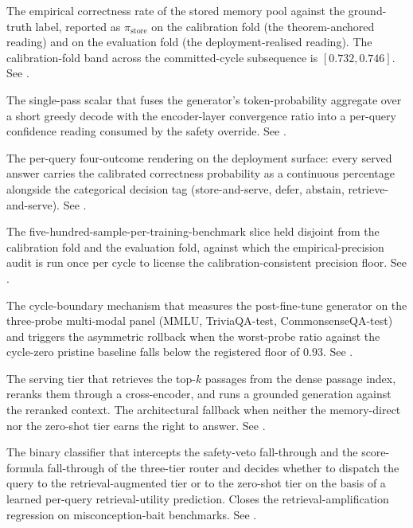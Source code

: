 \begin{description}[style=nextline, leftmargin=0pt, labelindent=0pt, itemsep=6pt, parsep=0pt, font=\bfseries, beginpenalty=10000]
\item[Pool purity.] The empirical correctness rate of the stored memory pool against the ground-truth label, reported as $\pi_{\text{store}}$ on the calibration fold (the theorem-anchored reading) and on the evaluation fold (the deployment-realised reading). The calibration-fold band across the committed-cycle subsequence is $[0.732, 0.746]$. See .

\item[Pre-routing confidence (\boldmath$u_{\text{pre}}$).] The single-pass scalar that fuses the generator's token-probability aggregate over a short greedy decode with the encoder-layer convergence ratio into a per-query confidence reading consumed by the safety override. See .

\item[Production envelope.] The per-query four-outcome rendering on the deployment surface: every served answer carries the calibrated correctness probability as a continuous percentage alongside the categorical decision tag (store-and-serve, defer, abstain, retrieve-and-serve). See .

\item[Purity-validation slice.] The five-hundred-sample-per-training-benchmark slice held disjoint from the calibration fold and the evaluation fold, against which the empirical-precision audit is run once per cycle to license the calibration-consistent precision floor. See .

\item[Retention guard.] The cycle-boundary mechanism that measures the post-fine-tune generator on the three-probe multi-modal panel (MMLU, TriviaQA-test, CommonsenseQA-test) and triggers the asymmetric rollback when the worst-probe ratio against the cycle-zero pristine baseline falls below the registered floor of $0.93$. See .

\item[Retrieval-augmented tier (Tier 3).] The serving tier that retrieves the top-$k$ passages from the dense passage index, reranks them through a cross-encoder, and runs a grounded generation against the reranked context. The architectural fallback when neither the memory-direct nor the zero-shot tier earns the right to answer. See .

\item[Retrieval-utility classifier (RUC).] The binary classifier that intercepts the safety-veto fall-through and the score-formula fall-through of the three-tier router and decides whether to dispatch the query to the retrieval-augmented tier or to the zero-shot tier on the basis of a learned per-query retrieval-utility prediction. Closes the retrieval-amplification regression on misconception-bait benchmarks. See .


\end{description}
